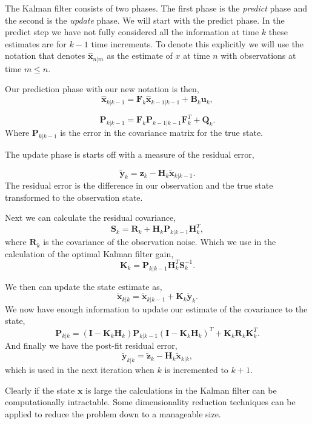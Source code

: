 The Kalman filter consists of two phases. The first phase is the \emph{predict} phase and the second is the \emph{update} phase. We will start with the predict phase. In the predict step we have not fully considered all the information at time $k$ these estimates are for $k-1$ time increments. To denote this explicitly we will use the notation that denotes $\hat{\mathbf{x}}_{n|m}$ as the estimate of $x$ at time $n$ with observations at time $m\leq n$.

Our prediction phase with our new notation is then,
\begin{equation}
\hat{\mathbf{x}}_{k|k-1} = \mathbf{F}_k\hat{\mathbf{x}}_{k-1|k-1} + \mathbf{B}_k\mathbf{u}_k,
\end{equation}

\begin{equation}
\mathbf{P}_{k|k-1} = \mathbf{F}_k\mathbf{P}_{k-1|k-1}\mathbf{F}_k^T + \mathbf{Q}_k.
\end{equation}
\noindent
Where $\mathbf{P}_{k|k-1}$ is the error in the covariance matrix for the true state. 

The update phase is starts off with a measure of the residual error,

\begin{equation}
\tilde{\mathbf{y}}_k = \mathbf{z}_k - \mathbf{H}_{k}\tilde{\mathbf{x}}_{k|k-1}.
\end{equation}
\noindent
The residual error is the difference in our observation and the true state transformed to the observation state. 

Next we can calculate the residual covariance,
\begin{equation}
\mathbf{S}_k = \mathbf{R}_k + \mathbf{H}_{k}\mathbf{P}_{k|k-1}\mathbf{H}_{k}^T,
\end{equation}
\noindent
where $\mathbf{R}_k$ is the covariance of the observation noise. Which we use in the calculation of the optimal Kalman filter gain,
\begin{equation}
\mathbf{K}_k = \mathbf{P}_{k|k-1}\mathbf{H}_{k}^T\mathbf{S}_k^{-1}.
\end{equation}
\noindent

We then can update the state estimate as,
\begin{equation}
\tilde{\mathbf{x}}_{k|k} = \tilde{\mathbf{x}}_{k|k-1} +  \mathbf{K}_k\tilde{\mathbf{y}}_{k}.
\end{equation}
\noindent
We now have enough information to update our estimate of the covariance to the state,
\begin{equation}
\mathbf{P}_{k|k} = \left(\mathbf{I} - \mathbf{K}_k\mathbf{H}_{k}\right) \mathbf{P}_{k|k-1}\left(\mathbf{I} - \mathbf{K}_k\mathbf{H}_{k}\right)^T + \mathbf{K}_k\mathbf{R}_k\mathbf{K}_k^T.
\end{equation}
\noindent
And finally we have the post-fit residual error,
\begin{equation}
\tilde{\mathbf{y}}_{k|k} = \tilde{\mathbf{z}}_{k} -  \mathbf{H}_k\tilde{\mathbf{x}}_{k|k},
\end{equation}
\noindent
which is used in the next iteration when $k$ is incremented to $k+1$. 

Clearly if the state $\mathbf{x}$ is large the calculations in the Kalman filter can be computationally intractable. Some dimensionality reduction techniques can be applied to reduce the problem down to a manageable size. 









